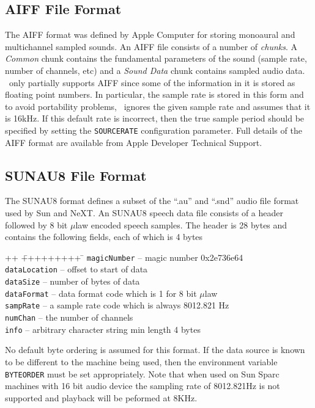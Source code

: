 \subsection{AIFF File Format}

The AIFF format was defined by Apple Computer for storing monoaural and
multichannel sampled sounds.  An AIFF file consists of a number of {\it
chunks}.  A {\it Common} chunk contains the fundamental parameters of the sound
(sample rate, number of channels, etc) and a {\it Sound Data} chunk contains
sampled audio data.  \HTK\ only partially supports AIFF since some of the
information in it is stored as floating point numbers.  In particular, the
sample rate is stored in this form and to avoid portability problems, 
\HTK\ ignores the given sample rate and assumes that it is 16kHz.  If this 
default rate is incorrect, then the true sample period should be
specified by setting the \texttt{SOURCERATE} configuration parameter.
Full details of the AIFF format are available from Apple Developer
Technical Support.

\subsection{SUNAU8 File Format}

The SUNAU8 format defines a subset of the ``.au'' and ``.snd'' audio file
format used by Sun and NeXT.  An SUNAU8 speech data file consists of a header
followed by 8 bit $\mu$law encoded speech samples.  The header is 28 bytes and
contains the following fields, each of which is 4 bytes
\begin{tabbing}
++ \= +++++++++ \= \kill
\>\texttt{magicNumber}  \>-- magic number 0x2e736e64 \\
\>\texttt{dataLocation} \>-- offset to start of data \\
\>\texttt{dataSize} \>-- number of bytes of data \\
\>\texttt{dataFormat} \>-- data format code which is 1 for 8 bit $\mu$law \\ 
\>\texttt{sampRate} \>-- a sample rate code which is always 8012.821 Hz \\ 
\>\texttt{numChan} \>-- the number of channels \\ 
\>\texttt{info} \>-- arbitrary character string min length 4 bytes
\end{tabbing}
No default byte ordering is assumed for this format. If the data source is
known to be different to the machine being used, then the environment variable
\texttt{BYTEORDER} must be set appropriately. Note that when used on Sun Sparc
machines with 16 bit audio device the sampling rate of 8012.821Hz is not
supported and playback will be peformed at 8KHz.

